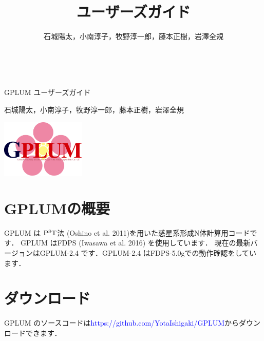 \documentclass[12pt,a4paper,dvipdfmx]{jsarticle}
\title{\ourcode ユーザーズガイド}
\author{石城陽太，小南淳子，牧野淳一郎，藤本正樹，岩澤全規}
\newcommand{\ourcode}{GPLUM\xspace}
\newcommand{\ourcodeR}{GPLUM-2.4\xspace}
\begin{document}

　\vspace{5mm}

\begin{center}
\hspace{27mm} {\huge \ourcode ユーザーズガイド}

\vspace{7mm}

\hspace{39mm} {\large 石城陽太，小南淳子，牧野淳一郎，藤本正樹，岩澤全規}
\end{center}

\begin{flushleft}
\vspace{-27mm}
\hspace{1mm} \includegraphics[width=4cm]{GPLUM_logo.pdf}
\end{flushleft}

\vspace{15mm}


\tableofcontents



\newpage

\section{GPLUMの概要}

\ourcode は ${\rm P^{3}T}$法 (Oshino et al. 2011)を用いた惑星系形成N体計算用コードです．
\ourcode はFDPS (Iwasawa et al. 2016) を使用しています．
現在の最新バージョンは\ourcodeR です．\ourcodeR はFDPS-5.0gでの動作確認をしています．


\section{ダウンロード}
\ourcode のソースコードは\textcolor{blue}{https://github.com/YotaIshigaki/GPLUM}からダウンロードできます．
\end{document}
